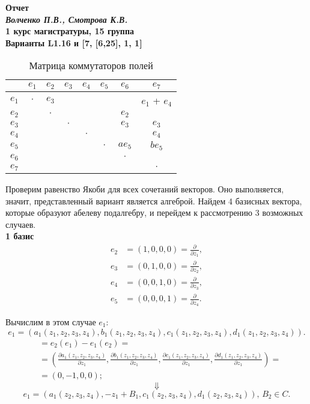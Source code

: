 \documentclass[12pt]{article}
\begin{document}
\begin{center}
\textbf{Отчет \\
    \textit{Волченко П.В., Смотрова К.В.} \\
    1 курс магистратуры, 15 группа \\
    Варианты L1.16 и [7, [6,25], 1, 1]}
\end{center}

\begin{table}[h!]
    \centering
    \renewcommand{\arraystretch}{1.5}
    \setlength{\arrayrulewidth}{0.3mm}
    \begin{tabular}{|c|c|c|c|c|c|c|c|}
        \hline
        & $e_1$ & $e_2$ & $e_3$ & $e_4$ & $e_5$ & $e_6$ & $e_7$ \\
        \hline
        $e_1$ & $\cdot$ & $e_3$ & & & & & $e_1$ + $e_4$ \\
        \hline
        $e_2$ & & $\cdot$ & & & & $e_2$ & \\
        \hline
        $e_3$ & & & $\cdot$ & & & $e_3$ & $e_3$\\
        \hline
        $e_4$ & & & & $\cdot$ & & & $e_4$ \\
        \hline
        $e_5$ & & & & & $\cdot$ & $a$$e_5$ & $b$$e_5$\\
        \hline
        $e_6$ & & & & & & $\cdot$ & \\
        \hline
        $e_7$ & & & & & & & $\cdot$ \\
        \hline
    \end{tabular}
    \caption{Матрица коммутаторов полей}
\end{table}

Проверим равенство Якоби для всех сочетаний векторов. Оно выполняется, значит, представленный вариант является алгеброй. Найдем 4 базисных вектора, которые образуют абелеву подалгебру, и перейдем к рассмотрению 3 возможных случаев. \\

\textbf{1 базис}
\begin{align*}
e_2 &= (1,0,0,0) = \frac{\partial}{\partial z_1}, \\
e_3 &= (0,1,0,0) = \frac{\partial}{\partial z_2}, \\
e_4 &= (0,0,1,0) = \frac{\partial}{\partial z_3}, \\
e_5 &= (0,0,0,1) = \frac{\partial}{\partial z_4}. 
\end{align*}

Вычислим в этом случае $e_1$:
$$e_1 = (a_1(z_1,z_2,z_3,z_4), b_1(z_1,z_2,z_3,z_4), c_1(z_1,z_2,z_3,z_4), d_1(z_1,z_2,z_3,z_4)).$$ 
\begin{align*}
[e_2,e_1] &= e_2(e_1) - e_1(e_2) = \\
&= \left(
\frac{\partial a_1(z_1,z_2,z_3,z_4)}{\partial z_1}, 
\frac{\partial b_1(z_1,z_2,z_3,z_4)}{\partial z_1}, 
\frac{\partial c_1(z_1,z_2,z_3,z_4)}{\partial z_1},
\frac{\partial d_1(z_1,z_2,z_3,z_4)}{\partial z_1}
\right) = \\
& = (0,-1,0,0);
\end{align*}
$$\Downarrow$$
$$e_1 = (a_1(z_2,z_3,z_4), -z_1 + B_1, c_1(z_2,z_3,z_4), d_1(z_2,z_3,z_4)), \, B_2 \in C.$$
\end{document}
